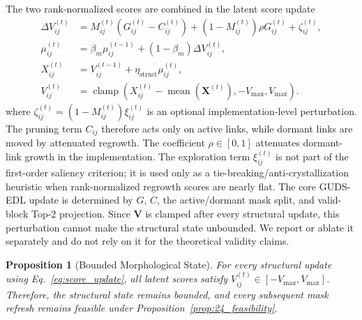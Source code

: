 \documentclass[letterpaper]{article} %
\newtheorem{proposition}{Proposition}
\begin{document}
The two rank-normalized scores are combined in the latent score update
\begin{equation}\label{eq:score_update}
\begin{aligned}
    \Delta V_{ij}^{(t)}
    &=
    M_{ij}^{(t)}
    \left(G_{ij}^{(t)}-C_{ij}^{(t)}\right)
    +
    \left(1-M_{ij}^{(t)}\right)
    \rho G_{ij}^{(t)}
    + \zeta_{ij}^{(t)},\\
    \mu_{ij}^{(t)} &= \beta_m\mu_{ij}^{(t-1)}+(1-\beta_m)\Delta V_{ij}^{(t)},\\
    X_{ij}^{(t)} &= V_{ij}^{(t-1)}+\eta_{\text{struct}}\mu_{ij}^{(t)},\\
    V_{ij}^{(t)} &=
    \operatorname{clamp}\!\left(
    X_{ij}^{(t)}-\operatorname{mean}(\bm{X}^{(t)}),
    -V_{\max},V_{\max}
    \right).
\end{aligned}
\end{equation}
where $\zeta_{ij}^{(t)}=(1-M_{ij}^{(t)})\xi_{ij}^{(t)}$ is an optional implementation-level perturbation. The pruning term $C_{ij}$ therefore acts only on active links, while dormant links are moved by attenuated regrowth. The coefficient $\rho\in[0,1]$ attenuates dormant-link growth in the implementation. The exploration term $\xi_{ij}^{(t)}$ is not part of the first-order saliency criterion; it is used only as a tie-breaking/anti-crystallization heuristic when rank-normalized regrowth scores are nearly flat. The core GUDS-EDL update is determined by $G$, $C$, the active/dormant mask split, and valid-block Top-2 projection. Since $\bm{V}$ is clamped after every structural update, this perturbation cannot make the structural state unbounded. We report or ablate it separately and do not rely on it for the theoretical validity claims.

\begin{proposition}[Bounded Morphological State]
\label{prop:bounded_scores}
For every structural update using Eq.~\ref{eq:score_update}, all latent scores satisfy $V_{ij}^{(t)}\in[-V_{\max},V_{\max}]$. Therefore, the structural state remains bounded, and every subsequent mask refresh remains feasible under Proposition~\ref{prop:24_feasibility}.
\end{proposition}
\end{document}
